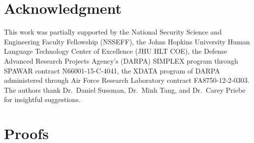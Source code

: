 \documentclass[11pt]{article}
\theoremstyle{definition}
\begin{document}
\clearpage



\section*{Acknowledgment}
This work was partially supported by the
%
National Security Science and Engineering Faculty Fellowship (NSSEFF),
%
the Johns Hopkins University Human Language Technology Center of Excellence (JHU HLT COE),  the
%
Defense Advanced Research Projects Agency's (DARPA) SIMPLEX program through SPAWAR contract N66001-15-C-4041,
%
the XDATA program of DARPA administered through Air Force Research Laboratory contract FA8750-12-2-0303.
%
The authors thank Dr.~Daniel Sussman, Dr.~Minh Tang,  and Dr.~Carey Priebe for insightful suggestions.

\clearpage
\appendix
\section{Proofs}
\label{ssec:proof}
\end{document}
